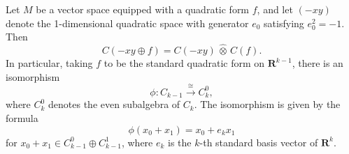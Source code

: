 Let $M$ be a vector space equipped with a quadratic form $f$, and let $(-xy)$ denote the 1-dimensional quadratic space with generator $e_0$ satisfying $e_0^2 = -1$. Then
$$C(-xy \oplus f) = C(-xy) \,\hat{\otimes}\, C(f).$$
In particular, taking $f$ to be the standard quadratic form on $\mathbf{R}^{k-1}$, there is an isomorphism
$$\phi: C_{k-1} \xrightarrow{\cong} C_k^0,$$
where $C_k^0$ denotes the even subalgebra of $C_k$. The isomorphism is given by the formula
$$\phi(x_0 + x_1) = x_0 + e_k x_1$$
for $x_0 + x_1 \in C_{k-1}^0 \oplus C_{k-1}^1$, where $e_k$ is the $k$-th standard basis vector of $\mathbf{R}^k$.
